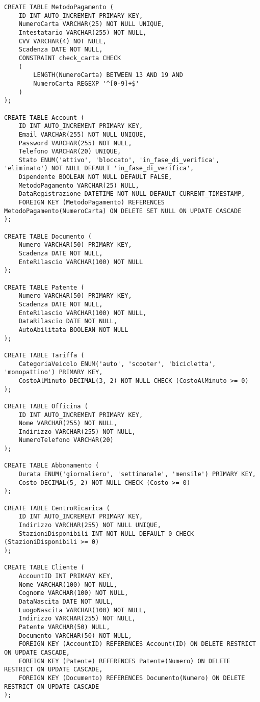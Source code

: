 \documentclass{article}
\begin{document}
\begin{lstlisting}
CREATE TABLE MetodoPagamento (
    ID INT AUTO_INCREMENT PRIMARY KEY,
    NumeroCarta VARCHAR(25) NOT NULL UNIQUE,
    Intestatario VARCHAR(255) NOT NULL,
    CVV VARCHAR(4) NOT NULL, 
    Scadenza DATE NOT NULL, 
    CONSTRAINT check_carta CHECK 
    (
        LENGTH(NumeroCarta) BETWEEN 13 AND 19 AND 
        NumeroCarta REGEXP '^[0-9]+$'
    )
);

CREATE TABLE Account (
    ID INT AUTO_INCREMENT PRIMARY KEY,
    Email VARCHAR(255) NOT NULL UNIQUE,
    Password VARCHAR(255) NOT NULL, 
    Telefono VARCHAR(20) UNIQUE,
    Stato ENUM('attivo', 'bloccato', 'in_fase_di_verifica', 'eliminato') NOT NULL DEFAULT 'in_fase_di_verifica',
    Dipendente BOOLEAN NOT NULL DEFAULT FALSE, 
    MetodoPagamento VARCHAR(25) NULL,
    DataRegistrazione DATETIME NOT NULL DEFAULT CURRENT_TIMESTAMP,
    FOREIGN KEY (MetodoPagamento) REFERENCES MetodoPagamento(NumeroCarta) ON DELETE SET NULL ON UPDATE CASCADE
);

CREATE TABLE Documento (
    Numero VARCHAR(50) PRIMARY KEY,
    Scadenza DATE NOT NULL,
    EnteRilascio VARCHAR(100) NOT NULL
);

CREATE TABLE Patente (
    Numero VARCHAR(50) PRIMARY KEY,
    Scadenza DATE NOT NULL,
    EnteRilascio VARCHAR(100) NOT NULL,
    DataRilascio DATE NOT NULL,
    AutoAbilitata BOOLEAN NOT NULL 
);

CREATE TABLE Tariffa (
    CategoriaVeicolo ENUM('auto', 'scooter', 'bicicletta', 'monopattino') PRIMARY KEY,
    CostoAlMinuto DECIMAL(3, 2) NOT NULL CHECK (CostoAlMinuto >= 0)
);

CREATE TABLE Officina (
    ID INT AUTO_INCREMENT PRIMARY KEY,
    Nome VARCHAR(255) NOT NULL,
    Indirizzo VARCHAR(255) NOT NULL,
    NumeroTelefono VARCHAR(20)
);

CREATE TABLE Abbonamento (
    Durata ENUM('giornaliero', 'settimanale', 'mensile') PRIMARY KEY, 
    Costo DECIMAL(5, 2) NOT NULL CHECK (Costo >= 0)
);

CREATE TABLE CentroRicarica (
    ID INT AUTO_INCREMENT PRIMARY KEY,
    Indirizzo VARCHAR(255) NOT NULL UNIQUE,
    StazioniDisponibili INT NOT NULL DEFAULT 0 CHECK (StazioniDisponibili >= 0)
);

CREATE TABLE Cliente (
    AccountID INT PRIMARY KEY,
    Nome VARCHAR(100) NOT NULL,
    Cognome VARCHAR(100) NOT NULL,
    DataNascita DATE NOT NULL, 
    LuogoNascita VARCHAR(100) NOT NULL,
    Indirizzo VARCHAR(255) NOT NULL, 
    Patente VARCHAR(50) NULL, 
    Documento VARCHAR(50) NOT NULL, 
    FOREIGN KEY (AccountID) REFERENCES Account(ID) ON DELETE RESTRICT ON UPDATE CASCADE,
    FOREIGN KEY (Patente) REFERENCES Patente(Numero) ON DELETE RESTRICT ON UPDATE CASCADE,
    FOREIGN KEY (Documento) REFERENCES Documento(Numero) ON DELETE RESTRICT ON UPDATE CASCADE
);


\end{lstlisting}
\end{document}
